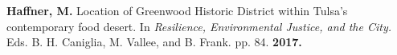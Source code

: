 \newpage



\begin{cventries}
   \cventry
      {}
      {}
      {}
      {}
      {
        \begin{cvitems}
          \vspace{-4mm}
        \item {\textbf{Haffner, M.} Location of Greenwood Historic District
            within Tulsa's contemporary food desert. In \textit{Resilience,
              Environmental Justice, and the City.} Eds. B. H. Caniglia, M.
            Vallee, and B.
            Frank. pp. 84. \textbf{2017.}} \\
          \vspace{-2mm}
        \end{cvitems}
    }

\end{cventries}